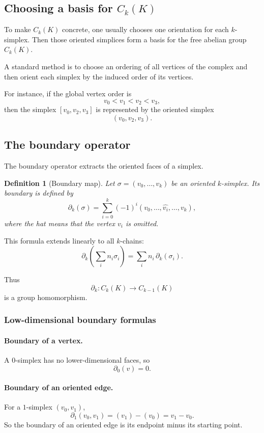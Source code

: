 \documentclass[12pt,a4paper]{article}
\newtheorem{definition}{Definition}[section]
\theoremstyle{notespace}
\begin{document}
\subsection{Choosing a basis for \(C_k(K)\)}

To make \(C_k(K)\) concrete, one usually chooses one orientation for each \(k\)-simplex. Then those oriented simplices form a basis for the free abelian group \(C_k(K)\).

A standard method is to choose an ordering of all vertices of the complex and then orient each simplex by the induced order of its vertices.

For instance, if the global vertex order is
\[
v_0 < v_1 < v_2 < v_3,
\]
then the simplex \([v_0,v_2,v_3]\) is represented by the oriented simplex
\[
(v_0,v_2,v_3).
\]

\subsection{The boundary operator}

The boundary operator extracts the oriented faces of a simplex.

\begin{definition}[Boundary map]
	Let \(\sigma=(v_0,\dots,v_k)\) be an oriented \(k\)-simplex. Its boundary is defined by
	\[
	\partial_k(\sigma)
	=
	\sum_{i=0}^{k} (-1)^i (v_0,\dots,\widehat{v_i},\dots,v_k),
	\]
	where the hat means that the vertex \(v_i\) is omitted.
\end{definition}

This formula extends linearly to all \(k\)-chains:
\[
\partial_k\left(\sum_i n_i \sigma_i\right)=\sum_i n_i\,\partial_k(\sigma_i).
\]

Thus
\[
\partial_k : C_k(K)\to C_{k-1}(K)
\]
is a group homomorphism.

\subsubsection*{Low-dimensional boundary formulas}

\paragraph{Boundary of a vertex.}
A \(0\)-simplex has no lower-dimensional faces, so
\[
\partial_0(v)=0.
\]

\paragraph{Boundary of an oriented edge.}
For a \(1\)-simplex \((v_0,v_1)\),
\[
\partial_1(v_0,v_1)=(v_1)-(v_0)=v_1-v_0.
\]
So the boundary of an oriented edge is its endpoint minus its starting point.
\end{document}
